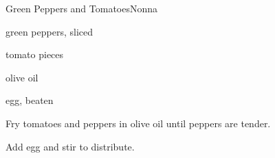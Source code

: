 \begin{recipe}{Green Peppers and Tomatoes}{Nonna}{}

\begin{ingredients}
\item green peppers, sliced
\item tomato pieces
\item olive oil
\item egg, beaten
\end{ingredients}

\begin{directions}
\item Fry tomatoes and peppers in olive oil until peppers are tender.
\item Add egg and stir to distribute.
\end{directions}

\end{recipe}

